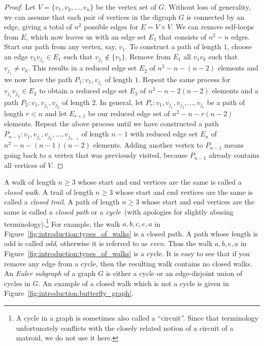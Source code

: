 \begin{proof}
Let $V = \{v_1, v_2, \dots, v_n\}$ be the vertex set of $G$. Without
loss of generality, we can assume that each pair of vertices in
the digraph $G$ is connected by an edge, giving a total of $n^2$
possible edges for $E = V \times V$. We can remove self-loops from
$E$, which now leaves us with an edge set $E_1$ that consists of
$n^2 - n$ edges. Start our path from any vertex, say, $v_1$. To
construct a path of length $1$, choose an edge $v_1 v_{j_1} \in E_1$
such that $v_{j_1} \notin \{v_1\}$. Remove from $E_1$ all $v_1 v_k$
such that $v_{j_1} \neq v_k$. This results in a reduced edge set $E_2$
of $n^2 - n - (n - 2)$ elements and we now have the path
$P_1: v_1, v_{j_1}$ of length $1$. Repeat the same process for
$v_{j_1} v_{j_2} \in E_2$ to obtain a reduced edge set $E_3$ of
$n^2 - n - 2(n - 2)$ elements and a path $P_2: v_1, v_{j_1}, v_{j_2}$
of length $2$. In general, let
$P_r: v_1, v_{j_1}, v_{j_2}, \dots, v_{j_r}$ be a path of length
$r < n$ and let $E_{r+1}$ be our reduced edge set of
$n^2 - n - r(n - 2)$ elements. Repeat the above process until we have
constructed a path
$P_{n-1}: v_1, v_{j_1}, v_{j_2}, \dots, v_{j_{n-1}}$ of length $n - 1$
with reduced edge set $E_n$ of $n^2 - n - (n - 1)(n - 2)$
elements. Adding another vertex to $P_{n-1}$ means going back to a
vertex that was previously visited, because $P_{n-1}$ already contains
all vertices of $V$.
\end{proof}

A walk of length $n \geq 3$ whose start and end vertices
are the same is called a \emph{closed walk}.
A trail of length $n \geq 3$ whose start and end vertices
are the same is called a \emph{closed trail}.
A path of length $n \geq 3$ whose start and end vertices
are the same is called a \emph{closed path}
or a \emph{cycle}~(with apologies for slightly abusing
terminology).\footnote{
  A cycle in a graph is sometimes also called a
  ``circuit''. Since that terminology unfortunately
  conflicts with the closely related notion of a circuit of a matroid,
  we do not use it here.
}
For example, the walk $a, b, c, e, a$ in
Figure~\ref{fig:introduction:types_of_walks} is a closed path. A path
whose length is odd is called \emph{odd}, otherwise it
is referred to as \emph{even}. Thus the walk
$a, b, e, a$ in Figure~\ref{fig:introduction:types_of_walks} is a
cycle. It is easy to see that if you remove any edge from a cycle,
then the resulting walk contains no closed walks. An
\emph{Euler subgraph} of a graph $G$ is either a
cycle or an edge-disjoint union of cycles in $G$. An example of a
closed walk which is not a cycle is given in
Figure~\ref{fig:introduction:butterfly_graph}.

